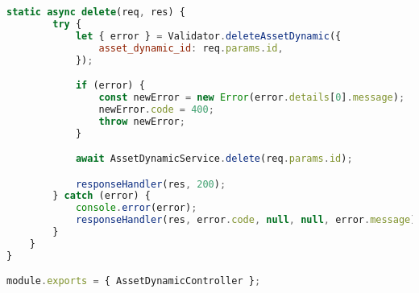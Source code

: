 \begin{lstlisting}[language=Javascript,caption={Asset Dynamic Controller}]
	static async delete(req, res) {
		try {
			let { error } = Validator.deleteAssetDynamic({
				asset_dynamic_id: req.params.id,
			});

			if (error) {
				const newError = new Error(error.details[0].message);
				newError.code = 400;
				throw newError;
			}

			await AssetDynamicService.delete(req.params.id);

			responseHandler(res, 200);
		} catch (error) {
			console.error(error);
			responseHandler(res, error.code, null, null, error.message);
		}
	}
}

module.exports = { AssetDynamicController };
\end{lstlisting}